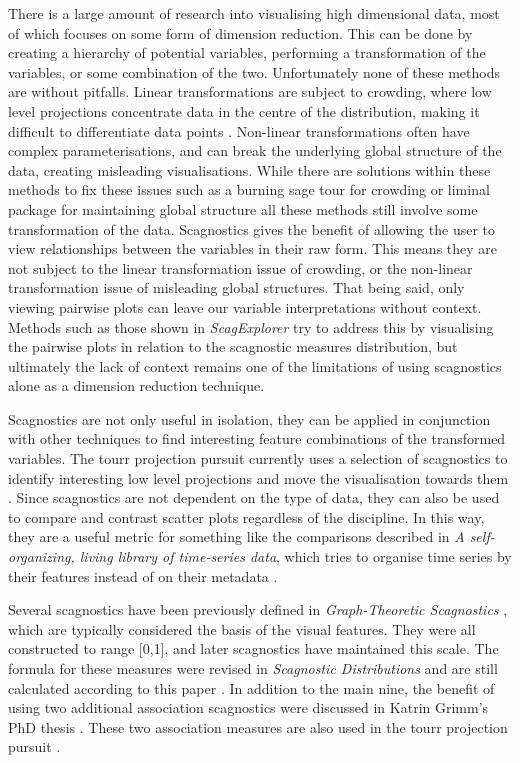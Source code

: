 There is a large amount of research into visualising high dimensional
data, most of which focuses on some form of dimension reduction. This
can be done by creating a hierarchy of potential variables, performing a
transformation of the variables, or some combination of the two.
Unfortunately none of these methods are without pitfalls. Linear
transformations are subject to crowding, where low level projections
concentrate data in the centre of the distribution, making it difficult
to differentiate data points \citep{crowding}. Non-linear
transformations often have complex parameterisations, and can break the
underlying global structure of the data, creating misleading
visualisations. While there are solutions within these methods to fix
these issues such as a burning sage tour for crowding
\citep{burningsage} or liminal package for maintaining global structure
\citep{liminal} all these methods still involve some transformation of
the data. Scagnostics gives the benefit of allowing the user to view
relationships between the variables in their raw form. This means they
are not subject to the linear transformation issue of crowding, or the
non-linear transformation issue of misleading global structures. That
being said, only viewing pairwise plots can leave our variable
interpretations without context. Methods such as those shown in
\emph{ScagExplorer} \citep{scagexplorer} try to address this by
visualising the pairwise plots in relation to the scagnostic measures
distribution, but ultimately the lack of context remains one of the
limitations of using scagnostics alone as a dimension reduction
technique.

Scagnostics are not only useful in isolation, they can be applied in
conjunction with other techniques to find interesting feature
combinations of the transformed variables. The tourr projection pursuit
currently uses a selection of scagnostics to identify interesting low
level projections and move the visualisation towards them
\citep{tourrpp}. Since scagnostics are not dependent on the type of
data, they can also be used to compare and contrast scatter plots
regardless of the discipline. In this way, they are a useful metric for
something like the comparisons described in \emph{A self-organizing,
living library of time-series data}, which tries to organise time series
by their features instead of on their metadata \citep{sots}.

Several scagnostics have been previously defined in
\emph{Graph-Theoretic Scagnostics} \citep{scag}, which are typically
considered the basis of the visual features. They were all constructed
to range {[}0,1{]}, and later scagnostics have maintained this scale.
The formula for these measures were revised in \emph{Scagnostic
Distributions} and are still calculated according to this paper
\citep{scagdist}. In addition to the main nine, the benefit of using two
additional association scagnostics were discussed in Katrin Grimm's PhD
thesis \citep{Grimm}. These two association measures are also used in
the tourr projection pursuit \citep{tourrpp}.

